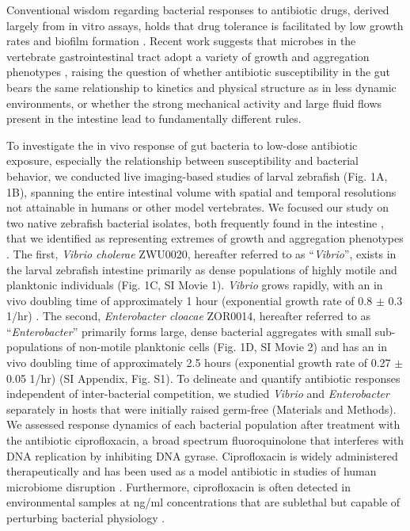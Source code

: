 Conventional wisdom regarding bacterial responses to antibiotic drugs, derived largely from in vitro assays, holds that drug tolerance is facilitated by low growth rates and biofilm formation \cite{walters2003contributions,fux2005survival}. Recent work suggests that microbes in the vertebrate gastrointestinal tract adopt a variety of growth and aggregation phenotypes \cite{korem2015growth,schlomann_bacterial_2018,moor_high-avidity_2017,welch_spatial_2017}, raising the question of whether antibiotic susceptibility in the gut bears the same relationship to kinetics and physical structure as in less dynamic environments, or whether the strong mechanical activity and large fluid flows present in the intestine \cite{cremer2017effect} lead to fundamentally different rules.

To investigate the in vivo response of gut bacteria to low-dose antibiotic exposure, especially the relationship between susceptibility and bacterial behavior, we conducted live imaging-based studies of larval zebrafish (Fig. 1A, 1B), spanning the entire intestinal volume with spatial and temporal resolutions not attainable in humans or other model vertebrates. We focused our study on two native zebrafish bacterial isolates, both frequently found in the intestine \cite{stephens_composition_2016}, that we identified as representing extremes of growth and aggregation phenotypes \cite{schlomann_bacterial_2018}. The first, \textit{Vibrio cholerae} ZWU0020, hereafter referred to as ``\textit{Vibrio}'', exists in the larval zebrafish intestine primarily as dense populations of highly motile and planktonic individuals (Fig. 1C, SI Movie 1).  \textit{Vibrio} grows rapidly, with an in vivo doubling time of approximately 1 hour (exponential growth rate of 0.8 $\pm$ 0.3 1/hr) \cite{wiles_host_2016}. The second,  \textit{Enterobacter cloacae} ZOR0014, hereafter referred to as ``\textit{Enterobacter}'' primarily forms large, dense bacterial aggregates with small sub-populations of non-motile planktonic cells (Fig. 1D, SI Movie 2) \cite{wiles_modernized_2018} and has an in vivo doubling time of approximately 2.5 hours (exponential growth rate of 0.27 $\pm$ 0.05 1/hr) (SI Appendix, Fig. S1). To delineate and quantify antibiotic responses independent of inter-bacterial competition, we studied \textit{Vibrio} and \textit{Enterobacter} separately in hosts that were initially raised germ-free (Materials and Methods). We assessed response dynamics of each bacterial population after treatment with the antibiotic ciprofloxacin, a broad spectrum fluoroquinolone that interferes with DNA replication by inhibiting DNA gyrase. Ciprofloxacin is widely administered therapeutically and has been used as a model antibiotic in studies of human microbiome disruption  \cite{relmanABX_2011}. Furthermore, ciprofloxacin is often detected in environmental samples at ng/ml concentrations that are sublethal but capable of perturbing bacterial physiology \cite{girardi2011biodegradation, goneau2015subinhibitory}. 



